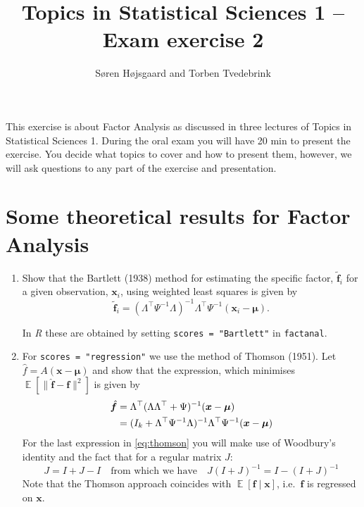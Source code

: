 \documentclass{article}
\DeclareMathOperator{\E}{\mathbb{E}}
\newcommand{\bx}{\ensuremath{\bm{x}}}
\newcommand{\bmf}{\ensuremath{\bm{f}}}
\newcommand{\bmu}{\ensuremath{\bm{\mu}}}
\newcommand{\Lm}{\ensuremath{\Lambda}}
\newcommand{\Lmt}{\ensuremath{\Lm\Lm^\top}}
\begin{document}
\title{Topics in Statistical Sciences 1 -- Exam exercise 2}
\author{S{\o}ren H{\o}jsgaard and Torben Tvedebrink}

\maketitle


This exercise is about Factor Analysis as discussed in three lectures
of Topics in Statistical Sciences 1. During the oral exam you will
have 20 min to present the exercise. You decide what topics to cover
and how to present them, however, we will ask questions to any part of
the exercise and presentation.

\section{Some theoretical results for Factor Analysis}
\label{sec:proof-non-decreasing}

\begin{enumerate}
\item Show that the Bartlett (1938) method for estimating the specific
  factor, $\tilde{\bmf}_i$ for a given observation, $\bx_i$, using
  weighted least squares is given by
  \begin{displaymath}
    \tilde{\bmf}_i = (\Lm^\top\Psi^{-1}\Lm)^{-1}\Lm^\top\Psi^{-1}(\bx_i-\bmu).
  \end{displaymath}

  In \textsl{R} these are obtained by setting \texttt{scores =
    "Bartlett"} in \texttt{factanal}.
\item For \texttt{scores = "regression"} we use the method of Thomson
  (1951). Let $\hat{f} = A(\bx-\bmu)$ and show that the expression,
  which minimises $\E[\|\hat{\bmf}-\bmf\|^2]$ is given by
  \begin{align}
    \hat{\bmf} &=  \Lm^\top(\Lmt+\Psi)^{-1}(\bx - \bmu)\notag\\
    &= (I_k + \Lm^\top\Psi^{-1}\Lm)^{-1}\Lm^\top\Psi^{-1}(\bx - \bmu)\label{eq:thomson}
  \end{align}
  For the last expression in \eqref{eq:thomson} you will make use of
  Woodbury's identity and the fact that for a regular matrix $J$:
  \begin{displaymath}
    J = I + J - I 
    \quad\text{from which we have}\quad
    J(I+J)^{-1} = I - (I+J)^{-1}
  \end{displaymath}
  Note that the Thomson approach coincides with $\E[\bmf\mid\bx]$,
  i.e.\ $\bmf$ is regressed on $\bx$.
\end{enumerate}
\end{document}
